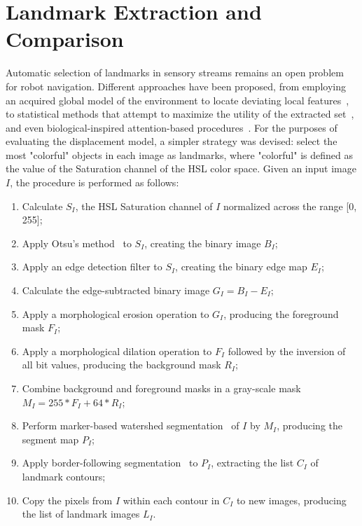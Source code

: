 \documentclass[twocolumn, 9pt]{jsproceedings}
\begin{document}
\section{Landmark Extraction and Comparison}

Automatic selection of landmarks in sensory streams remains an open problem for robot navigation. Different approaches have been proposed, from employing an acquired global model of the environment to locate deviating local features~\cite{marsland01}, to statistical methods that attempt to maximize the utility of the extracted set~\cite{thrun98}, and even biological-inspired attention-based procedures~\cite{chella07}. For the purposes of evaluating the displacement model, a simpler strategy was devised: select the most "colorful" objects in each image as landmarks, where "colorful" is defined as the value of the Saturation channel of the HSL color space. Given an input image \(I\), the procedure is performed as follows:

\begin{enumerate}
\item Calculate \(S_I\), the HSL Saturation channel of \(I\) normalized across the range [0, 255];
\item Apply Otsu's method~\cite{otsu79} to \(S_I\), creating the binary image \(B_I\);
\item Apply an edge detection filter to \(S_I\), creating the binary edge map \(E_I\);
\item Calculate the edge-subtracted binary image \(G_I = B_I - E_I\);
\item Apply a morphological erosion operation to \(G_I\), producing the foreground mask \(F_I\);
\item Apply a morphological dilation operation to \(F_I\) followed by the inversion of all bit values, producing the background mask \(R_I\);
\item Combine background and foreground masks in a gray-scale mask \(M_I = 255 * F_I + 64 * R_I\);
\item Perform marker-based watershed segmentation~\cite{meyer92} of \(I\) by \(M_I\), producing the segment map \(P_I\);
\item Apply border-following segmentation~\cite{suzuki85} to \(P_I\), extracting the list \(C_I\) of landmark contours;
\item Copy the pixels from \(I\) within each contour in \(C_I\) to new images, producing the list of landmark images \(L_I\).
\end{enumerate}
\end{document}
